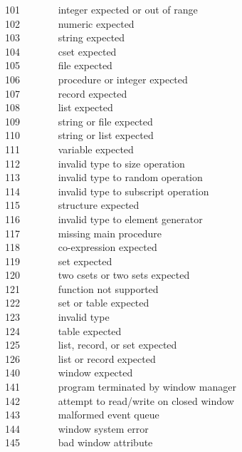 101 \ \ \ \ \ \ \ integer expected or out of range\\
102 \ \ \ \ \ \ \ numeric expected\\
103 \ \ \ \ \ \ \ string expected\\
104 \ \ \ \ \ \ \ cset expected\\
105 \ \ \ \ \ \ \ file expected\\
106 \ \ \ \ \ \ \ procedure or integer expected\\
107 \ \ \ \ \ \ \ record expected\\
108 \ \ \ \ \ \ \ list expected\\
109 \ \ \ \ \ \ \ string or file expected\\
110 \ \ \ \ \ \ \ string or list expected\\
111 \ \ \ \ \ \ \ variable expected\\
112 \ \ \ \ \ \ \ invalid type to size operation\\
113 \ \ \ \ \ \ \ invalid type to random operation\\
114 \ \ \ \ \ \ \ invalid type to subscript operation\\
115 \ \ \ \ \ \ \ structure expected\\
116 \ \ \ \ \ \ \ invalid type to element generator\\
117 \ \ \ \ \ \ \ missing main procedure\\
118 \ \ \ \ \ \ \ co-expression expected\\
119 \ \ \ \ \ \ \ set expected\\
120 \ \ \ \ \ \ \ two csets or two sets expected\\
121 \ \ \ \ \ \ \ function not supported\\
122 \ \ \ \ \ \ \ set or table expected\\
123 \ \ \ \ \ \ \ invalid type\\
124 \ \ \ \ \ \ \ table expected\\
125 \ \ \ \ \ \ \ list, record, or set expected\\
126 \ \ \ \ \ \ \ list or record expected\\
140 \ \ \ \ \ \ \ window expected\\
141 \ \ \ \ \ \ \ program terminated by window manager\\
142 \ \ \ \ \ \ \ attempt to read/write on closed window\\
143 \ \ \ \ \ \ \ malformed event queue\\
144 \ \ \ \ \ \ \ window system error\\
145 \ \ \ \ \ \ \ bad window attribute\\

